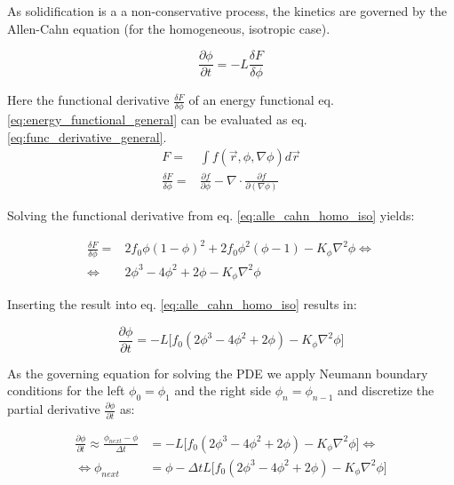As solidification is a a non-conservative process, the kinetics are governed by the Allen-Cahn equation (for the  homogeneous, isotropic case).

\begin{equation}
	\frac{\partial \phi}{\partial t} =-L \frac{\delta F}{\delta \phi} \label{eq:alle_cahn_homo_iso}
\end{equation}

Here the functional derivative \(\frac{\delta F}{\delta \phi}\) of an energy functional eq. \ref{eq:energy_functional_general} can be evaluated as eq. \ref{eq:func_derivative_general}.\\


\begin{subequations}
	\begin{align}
		F =& \int f(\vec{r}, \phi, \nabla \phi) d\vec{r} \label{eq:energy_functional_general} \\
		\frac{\delta F}{\delta \phi} =& \frac{\partial f}{ \partial \phi} - \nabla \cdot \frac{\partial f}{\partial (\nabla \phi)} \label{eq:func_derivative_general}
		\end{align}
\end{subequations}

Solving the functional derivative from eq. \ref{eq:alle_cahn_homo_iso} yields:

\begin{subequations}
	\begin{align}
		\frac{\delta F}{\delta \phi} =& 2 f_{0}\phi (1-\phi)^2 + 2 f_{0}\phi^{2} (\phi -1) - K_{\phi} \nabla^{2} \phi \Leftrightarrow \\
		\Leftrightarrow  & 2\phi^{3}  -4\phi^{2} + 2\phi - K_{\phi} \nabla^{2} \phi
	\end{align}
\end{subequations}

Inserting the result into eq. \ref{eq:alle_cahn_homo_iso} results in:

\begin{equation}
	\frac{\partial \phi}{\partial t} = -L \bigl[  f_0 ( 2\phi^{3} -4\phi^{2} + 2\phi) - K_{\phi} \nabla^{2} \phi \bigr]
\end{equation}

As the governing equation for solving the PDE we apply Neumann boundary conditions for the left \(\phi_{0} = \phi_{1}\) and the right side \(\phi_{n}= \phi_{n-1}\) and discretize the partial derivative \(\frac{\partial \phi}{\partial t}\) as:

\begin{subequations}
	\begin{align}
	\frac{\partial \phi}{\partial t}  \approx \frac{\phi_{next} - \phi}{\Delta t} &=  -L \bigl[  f_0 ( 2\phi^{3} -4\phi^{2} + 2\phi) - K_{\phi} \nabla^{2} \phi \bigr] \Leftrightarrow \\
	\Leftrightarrow \phi_{next} & = \phi -\Delta t L \bigl[  f_0 ( 2\phi^{3} -4\phi^{2} + 2\phi) - K_{\phi} \nabla^{2} \phi \bigr]
    \end{align}
\end{subequations}

